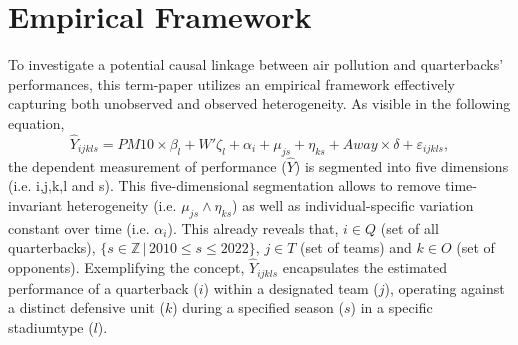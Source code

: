 \documentclass[12pt,a4paper]{article}
\begin{document}
\section{Empirical Framework}
To investigate a potential causal linkage between air pollution and quarterbacks' performances, this term-paper utilizes an empirical framework effectively capturing both unobserved and observed heterogeneity. As visible in the following equation,
\begin{equation}
\hat{Y}_{ijkls} = PM10 \times \beta_l + {W'} \zeta_l + \alpha_i + \mu_{js} + \eta_{ks} + Away \times \delta + \varepsilon_{ijkls},
\end{equation}
the dependent measurement of performance ($\hat{Y}$) is segmented into five dimensions (i.e. i,j,k,l and s). This five-dimensional segmentation allows to remove time-invariant heterogeneity (i.e. $ \mu_{js} \wedge \eta_{ks}$) as well as individual-specific variation constant over time (i.e. $\alpha_i$). This already reveals that, $i \in Q$ (set of all quarterbacks), $\{s \in \mathbb{Z} \, | \, 2010 \leq s \leq 2022\}$, $j \in T$ (set of teams) and $k \in O$ (set of opponents). Exemplifying the concept, $\hat{Y}_{ijkls}$ encapsulates the estimated performance of a quarterback ($i$) within a designated team ($j$), operating against a distinct defensive unit ($k$) during a specified season ($s$) in a specific stadiumtype ($l$). 
\end{document}
